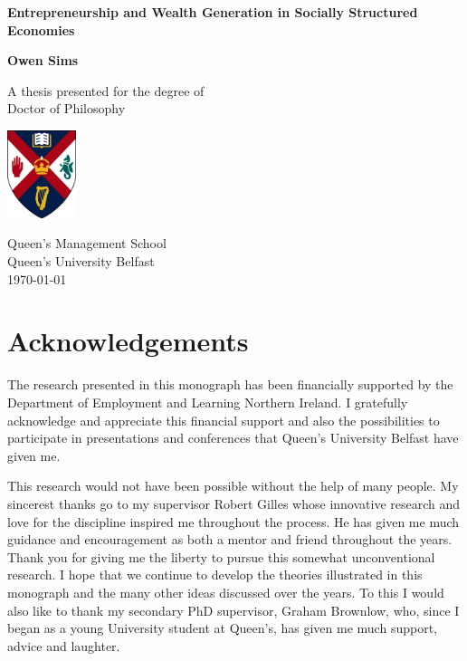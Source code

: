 \documentclass[11pt,fleqn]{book}
\begin{document}
\begin{titlepage}
    \begin{center}
        \vspace*{1cm}

        \huge
        \textbf{Entrepreneurship and Wealth Generation in Socially Structured Economies}

        \vspace{1.5cm}

        \Large
        \textbf{Owen Sims}

        \vfill

        \large
        A thesis presented for the degree of\\
        Doctor of Philosophy

        \vspace{0.8cm}

        \includegraphics[width=0.15\textwidth]{Images/qublogo2.png}

        \large
        Queen's Management School\\
        Queen's University Belfast\\
        \today

    \end{center}
\end{titlepage}


\thispagestyle{empty}

\newpage

\chapter*{Acknowledgements}

The research presented in this monograph has been financially supported by the Department of Employment and Learning Northern Ireland. I gratefully acknowledge and appreciate this financial support and also the possibilities to participate in presentations and conferences that Queen's University Belfast have given me.

This research would not have been possible without the help of many people. My sincerest thanks go to my supervisor Robert Gilles whose innovative research and love for the discipline inspired me throughout the process. He has given me much guidance and encouragement as both a mentor and friend throughout the years. Thank you for giving me the liberty to pursue this somewhat unconventional research. I hope that we continue to develop the theories illustrated in this monograph and the many other ideas discussed over the years. To this I would also like to thank my secondary PhD supervisor, Graham Brownlow, who, since I began as a young University student at Queen's, has given me much support, advice and laughter.
\end{document}
